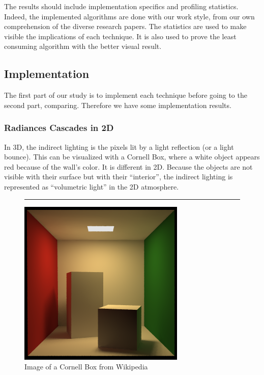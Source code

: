 \documentclass{rapportCS}
\begin{document}
The results should include implementation specifics and profiling statistics. Indeed, the implemented algorithms are done with our work style, from our own comprehension of the diverse research papers.
The statistics are used to make visible the implications of each technique. It is also used to prove the least consuming algorithm with the better visual result.


\subsection{Implementation}
The first part of our study is to implement each technique before going to the second part, comparing. Therefore we have some implementation results.

\subsubsection{Radiances Cascades in 2D}

In 3D, the indirect lighting is the pixels lit by a light reflection (or a light bounce). This can be visualized with a Cornell Box, where a white object appears red because of the wall’s color. It is different in 2D. Because the objects are not visible with their surface but with their “interior”, the indirect lighting is represented as “volumetric light” in the 2D atmosphere.

\begin{figure}
\centering
\rule{1cm}{1cm}
\includegraphics{figures/cornell_box.png}
\caption{Image of a Cornell Box from Wikipedia}
\end{figure}
\end{document}
